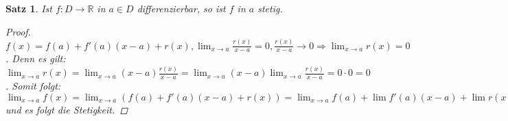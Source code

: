 \documentclass[ngerman,titlepage,twoside, parskip=half*]{scrreprt}
\newcommand*{\R}{\mathbb{R}}
\theoremstyle{break}
\newtheorem{theorem}{Satz}[section]
\theoremstyle{nonumberbreak}
\newtheorem{proof}{Beweis:}
\begin{document}
\begin{theorem}
  Ist $f\colon D\rightarrow\R$ in $a\in D$ differenzierbar, so ist $f$
  in $a$ stetig.
  \begin{proof}
    $f(x)=f(a)+f'(a)(x-a)+r(x), \lim_{x\rightarrow
      a}\frac{r(x)}{x-a}=0, \frac{r(x)}{x-a}\rightarrow 0 \Rightarrow
    \lim_{x\rightarrow a}r(x)=0$. Denn es gilt: $\lim_{x\rightarrow a}
    r(x)=\lim_{x\rightarrow a} (x-a)\frac{r(x)}{x-a}=\lim_{x\rightarrow a}
    (x-a) \lim_{x\rightarrow a} \frac{r(x)}{x-a}=0\cdot 0=0$. Somit folgt:
    $\lim_{x\rightarrow a} f(x)=\lim_{x\rightarrow a}
    (f(a)+f'(a)(x-a)+r(x))=\lim_{x\rightarrow a}
    f(a)+\lim f'(a)(x-a)+\lim r(x) =f(a)+0+0=f(a)$ und es folgt die Stetigkeit.
  \end{proof}
\end{theorem}
\end{document}
